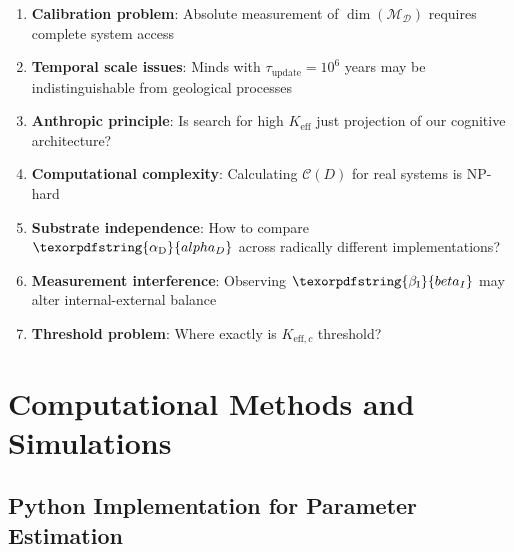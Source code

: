 \documentclass[12pt,a4paper]{article}
\DeclareRobustCommand{\alD}{\texorpdfstring{\ensuremath{\alpha_{\mathrm{D}}}}{alpha_D}}
\DeclareRobustCommand{\beI}{\texorpdfstring{\ensuremath{\beta_{\mathrm{I}}}}{beta_I}}
\newcommand{\Dict}{\mathcal{D}}
\newcommand{\Mdict}{\mathcal{M}_{\Dict}}
\newcommand{\Ke}{K_{\mathrm{eff}}}
\newcommand{\Kec}{K_{\mathrm{eff},c}}
\begin{document}
	\begin{enumerate}
		\item \textbf{Calibration problem}: Absolute measurement of \(\dim(\Mdict)\) requires complete system access
		\item \textbf{Temporal scale issues}: Minds with \(\tau_{\mathrm{update}} = 10^6\) years may be indistinguishable from geological processes
		\item \textbf{Anthropic principle}: Is search for high \(\Ke\) just projection of our cognitive architecture?
		\item \textbf{Computational complexity}: Calculating \(\mathcal{C}(D)\) for real systems is NP-hard
		\item \textbf{Substrate independence}: How to compare \(\alD\) across radically different implementations?
		\item \textbf{Measurement interference}: Observing \(\beI\) may alter internal-external balance
		\item \textbf{Threshold problem}: Where exactly is \(\Kec\) threshold?
	\end{enumerate}
	
	\section{Computational Methods and Simulations}
	
	\subsection{Python Implementation for Parameter Estimation}
	
\end{document}
